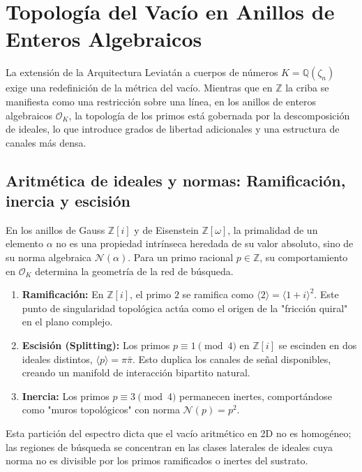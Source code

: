 \documentclass[12pt, a4paper]{article}
\theoremstyle{plain}
\theoremstyle{definition}
\theoremstyle{remark}
\newcommand{\Z}{\mathbb{Z}}
\newcommand{\Q}{\mathbb{Q}}
\newcommand{\OK}{\mathcal{O}_K}
\newcommand{\Norm}{\mathcal{N}}
\begin{document}
\section{Topología del Vacío en Anillos de Enteros Algebraicos}
\label{sec:topologia}

La extensión de la Arquitectura Leviatán a cuerpos de números $K = \Q(\zeta_n)$ exige una redefinición de la métrica del vacío. Mientras que en $\Z$ la criba se manifiesta como una restricción sobre una línea, en los anillos de enteros algebraicos $\OK$, la topología de los primos está gobernada por la descomposición de ideales, lo que introduce grados de libertad adicionales y una estructura de canales más densa.

\subsection{Aritmética de ideales y normas: Ramificación, inercia y escisión}

En los anillos de Gauss $\Z[i]$ y de Eisenstein $\Z[\omega]$, la primalidad de un elemento $\alpha$ no es una propiedad intrínseca heredada de su valor absoluto, sino de su norma algebraica $\Norm(\alpha)$. Para un primo racional $p \in \Z$, su comportamiento en $\OK$ determina la geometría de la red de búsqueda.

\begin{enumerate}[label=(\alph*)]
    \item \textbf{Ramificación:} En $\Z[i]$, el primo $2$ se ramifica como $\langle 2 \rangle = \langle 1+i \rangle^2$. Este punto de singularidad topológica actúa como el origen de la "fricción quiral" en el plano complejo.
    \item \textbf{Escisión (Splitting):} Los primos $p \equiv 1 \pmod 4$ en $\Z[i]$ se escinden en dos ideales distintos, $\langle p \rangle = \pi \bar{\pi}$. Esto duplica los canales de señal disponibles, creando un manifold de interacción bipartito natural.
    \item \textbf{Inercia:} Los primos $p \equiv 3 \pmod 4$ permanecen inertes, comportándose como "muros topológicos" con norma $\Norm(p) = p^2$.
\end{enumerate}

Esta partición del espectro dicta que el vacío aritmético en 2D no es homogéneo; las regiones de búsqueda se concentran en las clases laterales de ideales cuya norma no es divisible por los primos ramificados o inertes del sustrato.
\end{document}
